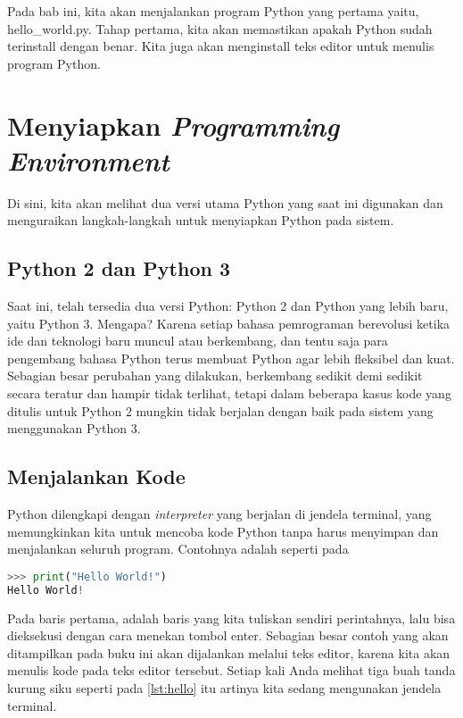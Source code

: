Pada bab ini, kita akan menjalankan program Python yang pertama yaitu, hello\_world.py. Tahap pertama, kita akan memastikan apakah Python sudah terinstall dengan benar. Kita juga akan menginstall teks editor untuk menulis program Python.
\section{Menyiapkan \textit{Programming Environment}}
Di sini, kita akan melihat dua versi utama Python yang saat ini digunakan dan menguraikan langkah-langkah untuk menyiapkan Python pada sistem.
\subsection{Python 2 dan Python 3}
Saat ini, telah tersedia dua versi Python: Python 2 dan Python yang lebih baru, yaitu Python 3. Mengapa? Karena setiap bahasa pemrograman berevolusi ketika ide dan teknologi baru muncul atau berkembang, dan tentu saja para pengembang bahasa Python terus membuat Python agar lebih fleksibel dan kuat. Sebagian besar perubahan yang dilakukan, berkembang sedikit demi sedikit secara teratur dan hampir tidak terlihat, tetapi dalam beberapa kasus kode yang ditulis untuk Python 2 mungkin tidak berjalan dengan baik pada sistem yang menggunakan Python 3.
\subsection{Menjalankan Kode}
Python dilengkapi dengan \textit{interpreter} yang berjalan di jendela terminal, yang memungkinkan kita untuk mencoba kode Python tanpa harus menyimpan dan menjalankan seluruh program. Contohnya adalah seperti pada
\begin{lstlisting}[language=Python, label={lst:hello}, caption=Kode Pada Jendela Terminal]
>>> print("Hello World!")
Hello World!
\end{lstlisting}
Pada baris pertama, adalah baris yang kita tuliskan sendiri perintahnya, lalu bisa dieksekusi dengan cara menekan tombol enter. Sebagian besar contoh yang akan ditampilkan pada buku ini akan dijalankan melalui teks editor, karena kita akan menulis kode pada teks editor tersebut. Setiap kali Anda melihat tiga buah tanda kurung siku seperti pada \ref{lst:hello} itu artinya kita sedang mengunakan jendela terminal.